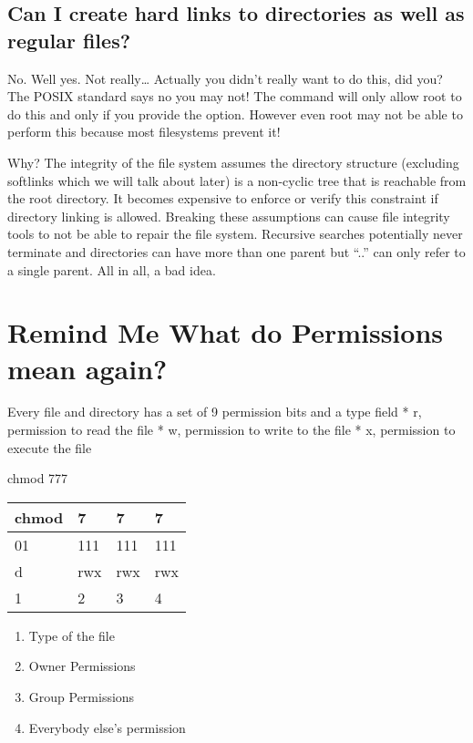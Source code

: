 \subsection{Can I create hard links to directories as well as regular files?}\label{can-i-create-hard-links-to-directories-as-well-as-regular-files}

No. Well yes. Not really\ldots{} Actually you didn't really want to do this, did you? The POSIX standard says no you may not! The  command will only allow root to do this and only if you provide the  option. However even root may not be able to perform this because most filesystems prevent it!

Why? The integrity of the file system assumes the directory structure (excluding softlinks which we will talk about later) is a non-cyclic tree that is reachable from the root directory. It becomes expensive to enforce or verify this constraint if directory linking is allowed. Breaking these assumptions can cause file integrity tools to not be able to repair the file system. Recursive searches potentially never terminate and directories can have more than one parent but ``..'' can only refer to a single parent. All in all, a bad idea.

\section{Remind Me What do Permissions mean again?}\label{remind-me-what-do-permissions-mean-again}

Every file and directory has a set of 9 permission bits and a type field * r, permission to read the file * w, permission to write to the file * x, permission to execute the file

chmod 777

\begin{longtable}[c]{@{}llll@{}}
\toprule
chmod & 7 & 7 & 7\tabularnewline
\midrule
\endhead
01 & 111 & 111 & 111\tabularnewline
d & rwx & rwx & rwx\tabularnewline
1 & 2 & 3 & 4\tabularnewline
\bottomrule
\end{longtable}

\begin{enumerate}
\def\labelenumi{\arabic{enumi}.}
\tightlist
\item
  Type of the file
\item
  Owner Permissions
\item
  Group Permissions
\item
  Everybody else's permission
\end{enumerate}

